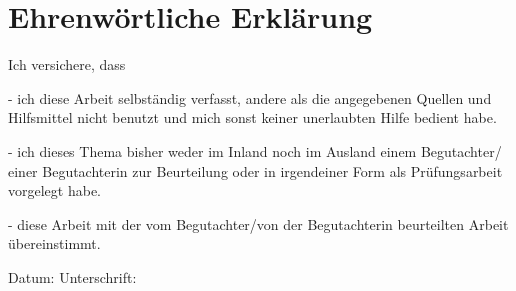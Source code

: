 \chapter*{Ehrenwörtliche Erklärung}
\label{ch:erklaerung}

\begin{flushleft}
Ich versichere, dass 
\end{flushleft}

\begin{flushleft}
- ich diese Arbeit selbständig verfasst, andere als die angegebenen Quellen und Hilfsmittel nicht benutzt und mich sonst keiner unerlaubten Hilfe bedient habe.
\end{flushleft}

\begin{flushleft}
- ich dieses Thema bisher weder im Inland noch im Ausland einem Begutachter/ einer Begutachterin zur Beurteilung oder in irgendeiner Form als Prüfungsarbeit vorgelegt habe.	
\end{flushleft}

\begin{flushleft}
- diese Arbeit mit der vom Begutachter/von der Begutachterin beurteilten Arbeit übereinstimmt. \\[1.5cm]	
\end{flushleft}
Datum:	\hrulefill\enspace Unterschrift: \hrulefill
\\[3.5cm]